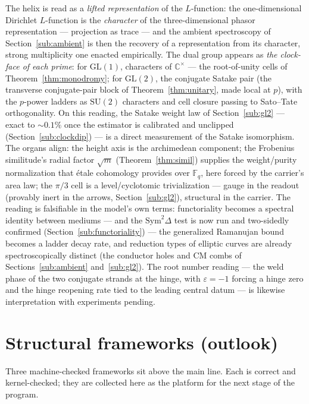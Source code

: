 \documentclass[11pt]{article}
\newcommand{\C}{\mathbb{C}}
\begin{document}
The helix is read as a \emph{lifted representation} of the $L$-function: the one-dimensional
Dirichlet $L$-function is the \emph{character} of the three-dimensional phasor representation ---
projection as trace --- and the ambient spectroscopy of Section~\ref{sub:ambient} is then the
recovery of a representation from its character, strong multiplicity one enacted empirically.  The
dual group appears as \emph{the clock-face of each prime}: for $\mathrm{GL}(1)$, characters of
$\C^{\times}$ --- the root-of-unity cells of Theorem~\ref{thm:monodromy}; for $\mathrm{GL}(2)$, the
conjugate Satake pair (the transverse conjugate-pair block of Theorem~\ref{thm:unitary}, made
local at $p$), with the $p$-power ladders as $\mathrm{SU}(2)$ characters and cell closure passing
to Sato--Tate orthogonality.  On this reading, the Satake weight law of
Section~\ref{sub:gl2} --- exact to ${\sim}0.1\%$ once the estimator is calibrated and unclipped
(Section~\ref{sub:clockdip}) --- is a direct measurement of the Satake isomorphism.  The organs align: the
height axis is the archimedean component; the Frobenius similitude's radial factor $\sqrt m$
(Theorem~\ref{thm:simil}) supplies the weight/purity normalization that \'etale cohomology provides
over $\mathbb{F}_q$, here forced by the carrier's area law; the $\pi/3$ cell is a level/cyclotomic
trivialization --- gauge in the readout (provably inert in the arrows,
Section~\ref{sub:gl2}), structural in the carrier.  The reading is falsifiable in the model's own
terms: functoriality becomes a spectral identity between mediums --- and the
$\mathrm{Sym}^2\Delta$ test is now run and two-sidedly confirmed
(Section~\ref{sub:functoriality}) --- the generalized Ramanujan bound becomes a ladder decay rate, and
reduction types of elliptic curves are already spectroscopically distinct (the conductor holes and
CM combs of Sections~\ref{sub:ambient} and~\ref{sub:gl2}).  The root number reading --- the weld
phase of the two conjugate strands at the hinge, with $\varepsilon=-1$ forcing a hinge zero and
the hinge reopening rate tied to the leading central datum --- is likewise interpretation with
experiments pending.

\section{Structural frameworks (outlook)}\label{sec:outlook}

Three machine-checked frameworks sit above the main line.  Each is correct and kernel-checked;
they are collected here as the platform for the next stage of the program.
\end{document}
